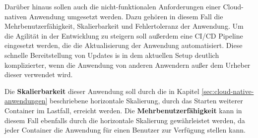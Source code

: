Darüber hinaus sollen auch die nicht-funktionalen Anforderungen einer Cloud-nativen Anwendung umgesetzt werden. Dazu gehören in diesem Fall die Mehrbenutzerfähigkeit, Skalierbarkeit und Fehlertoleranz der Anwendung. Um die Agilität in der Entwicklung zu steigern soll außerdem eine CI/CD Pipeline eingesetzt werden, die die Aktualisierung der Anwendung automatisiert. Diese schnelle Bereitstellung von Updates is in dem aktuellen Setup deutlich komplizierter, wenn die Anwendung von anderen Anwendern außer dem Urheber dieser verwendet wird.

Die \textbf{Skalierbarkeit} dieser Anwendung soll durch die in Kapitel \ref{sec:cloud-native-anwendungen} beschriebene horizontale Skalierung, durch das Starten weiterer Container im Lastfall, erreicht werden. Die \textbf{Mehrbenutzerfähigkeit} kann in diesem Fall ebenfalls durch die horizontale Skalierung gewährleistet werden, da jeder Container die Anwendung für einen Benutzer zur Verfügung stellen kann. \pagebreak
